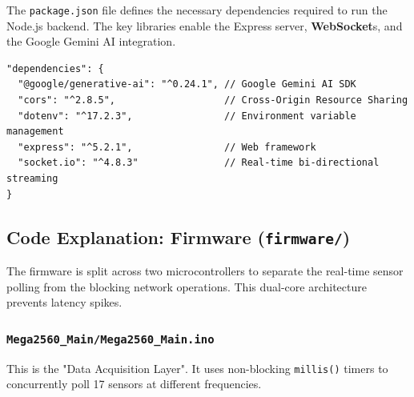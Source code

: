 \documentclass[12pt,a4paper]{article}
\newcommand{\keyword}[1]{\textcolor{keywordcolor}{\textbf{#1}}}
\newcommand{\codeinline}[1]{\texttt{\small #1}}
\begin{document}
The \texttt{package.json} file defines the necessary dependencies required to run the Node.js backend. The key libraries enable the Express server, \keyword{WebSocket}s, and the Google Gemini AI integration.

\begin{verbatim}
"dependencies": {
  "@google/generative-ai": "^0.24.1", // Google Gemini AI SDK
  "cors": "^2.8.5",                   // Cross-Origin Resource Sharing
  "dotenv": "^17.2.3",                // Environment variable management
  "express": "^5.2.1",                // Web framework
  "socket.io": "^4.8.3"               // Real-time bi-directional streaming
}
\end{verbatim}

\vspace{0.5cm}

\subsection*{Code Explanation: Firmware (\texttt{firmware/})}

The firmware is split across two microcontrollers to separate the real-time sensor polling from the blocking network operations. This dual-core architecture prevents latency spikes.

\subsubsection*{\codeinline{Mega2560\_Main/Mega2560\_Main.ino}}
This is the "Data Acquisition Layer". It uses non-blocking \texttt{millis()} timers to concurrently poll 17 sensors at different frequencies.
\end{document}
